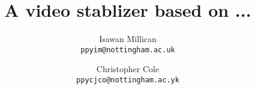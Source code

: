 \documentclass{article}
\begin{document}
\title{A video stablizer based on ...}
\author{
    Isawan Millican \\
    \texttt{ppyim@nottingham.ac.uk}\\
    \and
    Christopher Cole \\
    \texttt{ppycjco@nottingham.ac.yk}}
\maketitle
\end{document}

